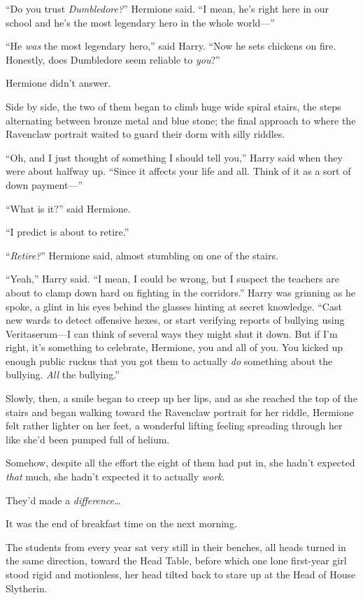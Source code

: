 “Do you trust \emph{Dumbledore?}” Hermione said.
“I mean, he’s right here in our school and he’s the most legendary hero in the whole world—”

“He \emph{was} the most legendary hero,” said Harry.
“Now he sets chickens on fire. Honestly, does Dumbledore seem reliable to \emph{you}?”

Hermione didn’t answer.

Side by side, the two of them began to climb huge wide spiral stairs, the steps alternating between bronze metal and blue stone; the final approach to where the Ravenclaw portrait waited to guard their dorm with silly riddles.

“Oh, and I just thought of something I should tell you,” Harry said when they were about halfway up.
“Since it affects your life and all. Think of it as a sort of down payment—”

“What is it?” said Hermione.

“I predict \SPHEW is about to retire.”

“\emph{Retire?}” Hermione said, almost stumbling on one of the stairs.

“Yeah,” Harry said.
“I mean, I could be wrong, but I suspect the teachers are about to clamp down hard on fighting in the corridors.” Harry was grinning as he spoke, a glint in his eyes behind the glasses hinting at secret knowledge.
“Cast new wards to detect offensive hexes, or start verifying reports of bullying using Veritaserum—I can think of several ways they might shut it down. But if I’m right, it’s something to celebrate, Hermione, you and all of you. You kicked up enough public ruckus that you got them to actually \emph{do} something about the bullying. \emph{All} the bullying.”

Slowly, then, a smile began to creep up her lips, and as she reached the top of the stairs and began walking toward the Ravenclaw portrait for her riddle, Hermione felt rather lighter on her feet, a wonderful lifting feeling spreading through her like she’d been pumped full of helium.

Somehow, despite all the effort the eight of them had put in, she hadn’t expected \emph{that} much, she hadn’t expected it to actually \emph{work}.

They’d made a \emph{difference…}

\later

It was the end of breakfast time on the next morning.

The students from every year sat very still in their benches, all heads turned in the same direction, toward the Head Table, before which one lone first-year girl stood rigid and motionless, her head tilted back to stare up at the Head of House Slytherin.

